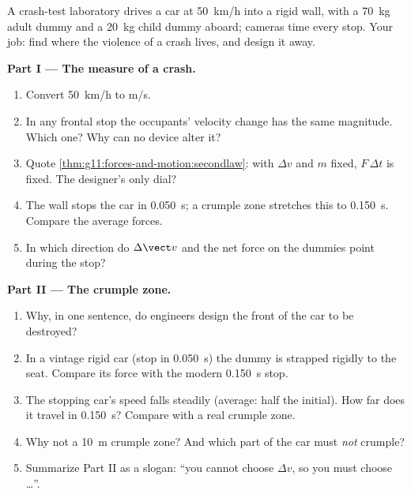 \begin{problem}
\label{pb:g11:forces-and-motion:1}
A crash-test laboratory drives a car at \qty{50}{km/h} into a rigid
wall, with a \qty{70}{kg} adult dummy and a \qty{20}{kg} child dummy
aboard; cameras time every stop. Your job: find where the violence of a
crash lives, and design it away.

\medskip
\noindent\textbf{Part I --- The measure of a crash.}
\begin{enumerate}
  \item Convert \qty{50}{km/h} to \unit{m/s}.
  \item In any frontal stop the occupants' velocity change has the same
        magnitude. Which one? Why can no device alter it?
  \item Quote \cref{thm:g11:forces-and-motion:secondlaw}: with $\Delta v$
        and $m$ fixed, $F\,\Delta t$ is fixed. The designer's only dial?
  \item The wall stops the car in \qty{0.050}{s}; a crumple zone
        stretches this to \qty{0.150}{s}. Compare the average forces.
  \item In which direction do $\Delta \vect v$ and the net force on
        the dummies point during the stop?
\end{enumerate}

\medskip
\noindent\textbf{Part II --- The crumple zone.}
\begin{enumerate}[resume]
  \item Why, in one sentence, do engineers design the front of the car
        to be destroyed?
  \item In a vintage rigid car (stop in \qty{0.050}{s}) the dummy is strapped
        rigidly to the seat. Compare its force with the modern \qty{0.150}{s} stop.
  \item The stopping car's speed falls steadily (average: half the initial).
        How far does it travel in \qty{0.150}{s}? Compare with a real crumple zone.
  \item Why not a \qty{10}{m} crumple zone? And which part of the car
        must \emph{not} crumple?
  \item Summarize Part II as a slogan: ``you cannot choose $\Delta v$,
        so you must choose \dots''.
\end{enumerate}


\end{problem}
